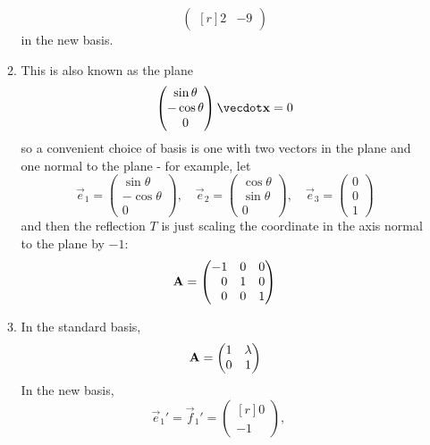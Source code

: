 \documentclass[fleqn,a4paper,11pt]{article}
\begin{document}
\begin{enumerate}[label=\textbf{\arabic*.}]
\begin{enumerate}[label=(\alph*)]
\begin{equation*}
\begin{pmatrix*}[r]
      2 & -9
     \end{pmatrix*}
    \end{equation*}
    in the new basis.
   \item
    This is also known as the plane
    \begin{equation*}
     \begin{pmatrix} \sin \theta \\ -\cos \theta \\ 0 \end{pmatrix}
      \vecdot \vec x = 0
    \end{equation*}
    so a convenient choice of basis is one with two vectors in the plane and one
    normal to the plane - for example, let
    \begin{equation*}
     \vec e_1 = \begin{pmatrix} \sin \theta \\ -\cos \theta \\ 0 \end{pmatrix},
     \quad
     \vec e_2 = \begin{pmatrix} \cos \theta \\ \sin \theta \\ 0 \end{pmatrix},
     \quad
     \vec e_3 = \begin{pmatrix} 0 \\ 0 \\ 1 \end{pmatrix}
    \end{equation*}
    and then the reflection \(T\) is just scaling the coordinate in the axis
    normal to the plane by \(-1\):
    \begin{equation*}
     \mat A =
     \begin{pmatrix*}[r]
      -1 & 0 & 0 \\
      0 & 1 & 0 \\
      0 & 0 & 1
     \end{pmatrix*}
    \end{equation*}
   \item
    In the standard basis,
    \begin{equation*}
     \mathbf{A} =
     \begin{pmatrix}
      1 & \lambda \\
      0 & 1
     \end{pmatrix}
    \end{equation*}
    In the new basis,
    \begin{equation*}
     \vec e_1' = \vec f_1' = \begin{pmatrix*}[r] 0 \\ -1 \end{pmatrix*}, \quad

\end{equation*}
\end{enumerate}
\end{enumerate}
\end{document}
